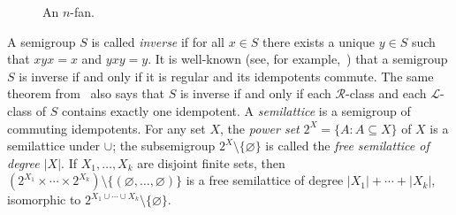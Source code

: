 \documentclass[ALCO,ThmDefs,Unicode,epreuves]{cedram}
\newcommand{\vertex}[3]{\node [vertex] (#1) at (#2, #3 * 1.7) {};}
\newcommand{\arc}[2]{{\draw[-latex] (#1) edge (#2);}}
\newcommand{\LL}{\mathcal{L}}
\newcommand{\R}{\mathcal{R}}
\begin{document}
\begin{figure}[ht] \centering
 \caption{An $n$-fan.}
 \label{fig-fan}
\end{figure}

A semigroup $S$ is called \emph{inverse} if for all $x\in S$ there exists a
unique $y\in S$ such that $xyx = x$ and $yxy = y$. It is well-known (see, for
example,~\cite[Theorem~5.1.1]{Howie1995aa}) that a semigroup $S$ is inverse if and only
if it is regular and its idempotents commute. The same theorem from~\cite{Howie1995aa}
also says that $S$ is inverse if and only if each $\R$-class and each
$\LL$-class of $S$ contains exactly one idempotent. A \emph{semilattice} is a
semigroup of commuting idempotents. For any set $X$, the \emph{power set}
$2^X=\{A:A\subseteq X\}$ of $X$ is a semilattice under $\cup$; the subsemigroup $2^X\setminus\{\varnothing\}$ is called the
\emph{free semilattice of degree $|X|$}. If $X_1,\ldots,X_k$ are disjoint finite sets, then $(2^{X_1}\times\cdots\times2^{X_k})\setminus\{(\varnothing,\ldots,\varnothing)\}$ is a free semilattice of degree $|X_1|+\cdots+|X_k|$, isomorphic to $2^{X_1\cup\cdots\cup X_k}\setminus\{\varnothing\}$.
\end{document}
